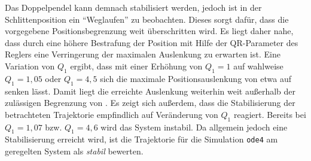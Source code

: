 Das Doppelpendel kann demnach stabilisiert werden, jedoch ist in der Schlittenposition ein "`Weglaufen"' zu beobachten. Dieses sorgt dafür, dass die vorgegebene Positionsbegrenzung weit überschritten wird. Es liegt daher nahe, dass durch eine höhere Bestrafung der Position mit Hilfe der QR-Parameter des Reglers eine Verringerung der maximalen Auslenkung zu erwarten ist. Eine Variation von $Q_1$ ergibt, dass mit einer Erhöhung von $Q_1=1$ auf wahlweise $Q_1=1,05$ oder $Q_1=4,5$ sich die maximale Positionsauslenkung von etwa  auf  senken lässt. Damit liegt die erreichte Auslenkung weiterhin weit außerhalb der zulässigen Begrenzung von . Es zeigt sich außerdem, dass die Stabilisierung der betrachteten Trajektorie empfindlich auf Veränderung von $Q_1$ reagiert. Bereits bei $Q_1=1,07$ bzw. $Q_1=4,6$ wird das System instabil. Da allgemein jedoch eine Stabilisierung erreicht wird, ist die Trajektorie für die Simulation \texttt{ode4} am geregelten System als \textit{stabil} bewerten. 

